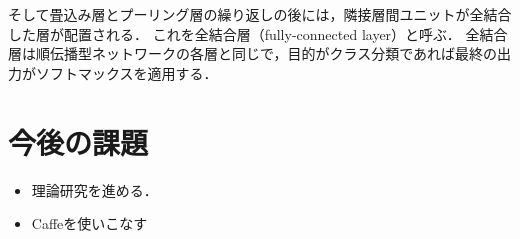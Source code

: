 \documentclass[a4paper,10pt]{jsarticle}
\begin{document}
そして畳込み層とプーリング層の繰り返しの後には，隣接層間ユニットが全結合した層が配置される．
これを全結合層（fully-connected layer）と呼ぶ．
全結合層は順伝播型ネットワークの各層と同じで，目的がクラス分類であれば最終の出力がソフトマックスを適用する．



\section{今後の課題}
\begin{itemize}
 \item 理論研究を進める．
 \item Caffeを使いこなす
\end{itemize}
\end{document}
